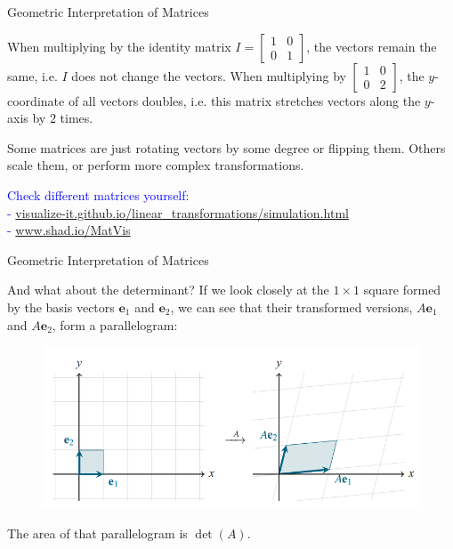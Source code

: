 \documentclass{beamer}
\newcommand{\ve}{\mathbf{e}}
\begin{document}
\begin{frame}{Geometric Interpretation of Matrices}

When multiplying by the identity matrix $I=\begin{bmatrix}
    1&0\\0&1
\end{bmatrix}$, the vectors remain the same, i.e. $I$ does not change the vectors.  When multiplying by $\begin{bmatrix}
    1&0\\0&2
\end{bmatrix}$, the $y$-coordinate of all vectors doubles, i.e. this matrix stretches vectors along the $y$-axis by $2$ times.

\pause 

\bigskip

Some matrices are just rotating vectors by some degree or flipping them. Others scale them, or perform more complex transformations.   

\bigskip

\textcolor{blue}{Check different matrices yourself:\\ - \url{visualize-it.github.io/linear_transformations/simulation.html} 
\\ - \url{www.shad.io/MatVis}
}


    
\end{frame}


\begin{frame}{Geometric Interpretation of Matrices}

And what about the determinant? If we look closely at the $1\times 1$ square formed by the basis vectors $\ve_1$ and $\ve_2$, we can see that their transformed versions, $A\ve_1$ and $A\ve_2$, form a parallelogram:

\begin{figure}
    \centering
    \includegraphics[width=0.75\linewidth]{viz det.png}
    
    
\end{figure}

\pause The area of that parallelogram is $\det(A)$.
\end{frame}
\end{document}
